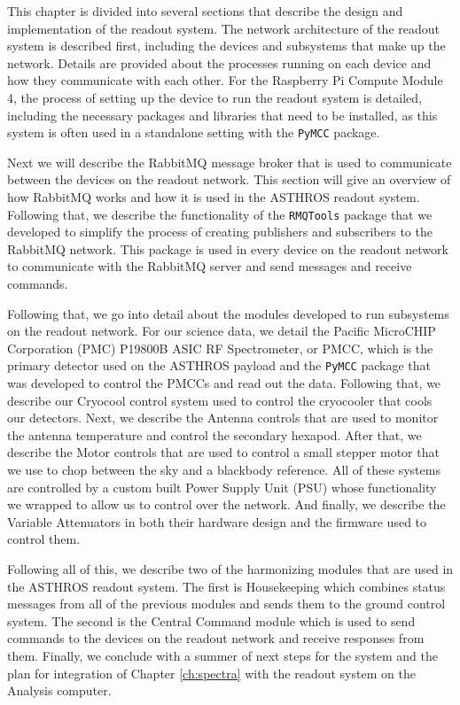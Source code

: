 This chapter is divided into several sections that describe the design and implementation of the readout system.
The network architecture of the readout system is described first, including the devices and subsystems that make up the network.
Details are provided about the processes running on each device and how they communicate with each other.
For the Raspberry Pi Compute Module 4, the process of setting up the device to run the readout system is detailed, including the necessary packages and libraries that need to be installed, as this system is often used in a standalone setting with the \texttt{PyMCC} package.

Next we will describe the RabbitMQ message broker that is used to communicate between the devices on the readout network.
This section will give an overview of how RabbitMQ works and how it is used in the ASTHROS readout system.
Following that, we describe the functionality of the \texttt{RMQTools} package that we developed to simplify the process of creating publishers and subscribers to the RabbitMQ network.
This package is used in every device on the readout network to communicate with the RabbitMQ server and send messages and receive commands.

Following that, we go into detail about the modules developed to run subsystems on the readout network.
For our science data, we detail the Pacific MicroCHIP Corporation (PMC) P19800B ASIC RF Spectrometer, or PMCC, which is the primary detector used on the ASTHROS payload and the \texttt{PyMCC} package that was developed to control the PMCCs and read out the data.
Following that, we describe our Cryocool control system used to control the cryocooler that cools our detectors.
Next, we describe the Antenna controls that are used to monitor the antenna temperature and control the secondary hexapod. 
After that, we describe the Motor controls that are used to control a small stepper motor that we use to chop between the sky and a blackbody reference.
All of these systems are controlled by a custom built Power Supply Unit (PSU) whose functionality we wrapped to allow us to control over the network.
And finally, we describe the Variable Attenuators in both their hardware design and the firmware used to control them.

Following all of this, we describe two of the harmonizing modules that are used in the ASTHROS readout system.
The first is Housekeeping which combines status messages from all of the previous modules and sends them to the ground control system.
The second is the Central Command module which is used to send commands to the devices on the readout network and receive responses from them.
Finally, we conclude with a summer of next steps for the system and the plan for integration of Chapter \ref{ch:spectra} with the readout system on the Analysis computer. 

